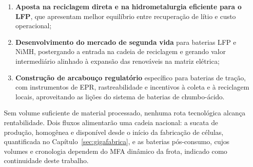 \begin{enumerate}
    \item \textbf{Aposta na reciclagem direta e na hidrometalurgia eficiente para o
    LFP}, que apresentam melhor equilíbrio entre recuperação de lítio e custo
    operacional;

    \item \textbf{Desenvolvimento do mercado de segunda vida} para baterias LFP e
    NiMH, postergando a entrada na cadeia de reciclagem e gerando valor
    intermediário alinhado à expansão das renováveis na matriz elétrica;

    \item \textbf{Construção de arcabouço regulatório} específico para baterias de
    tração, com instrumentos de EPR, rastreabilidade e incentivos à coleta e à
    reciclagem locais, aproveitando as lições do sistema de baterias de
    chumbo-ácido.
\end{enumerate}

Sem volume suficiente de material processado, nenhuma rota tecnológica alcança
rentabilidade. Dois fluxos alimentarão uma cadeia nacional: a sucata de produção,
homogênea e disponível desde o início da fabricação de células, quantificada no
Capítulo~\ref{sec:gigafabrica}, e as baterias pós-consumo, cujos volumes e
cronologia dependem do MFA dinâmico da frota, indicado como continuidade deste
trabalho.
